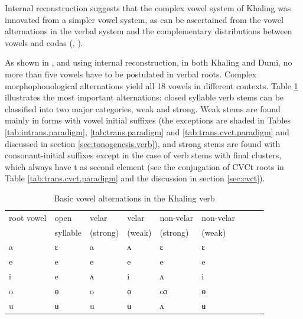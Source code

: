 \documentclass[oldfontcommands,oneside,a4paper,11pt]{article}
\newcommand{\ipa}[1]{{\phon \mbox{#1}}} %
\begin{document}
Internal reconstruction suggests that the complex vowel system of Khaling was innovated from a simpler vowel system, as can be ascertained from the vowel alternations in the verbal system and the complementary distributions between vowels and codas (\citealt{michailovsky75khaling}, \citealt{jacques12khaling}). 

As shown in \citet{michailovsky75khaling}, \citet{jacques12khaling} and \citet{michailovsky12dumi} using internal reconstruction, in both Khaling and Dumi, no more than five vowels have to be postulated in verbal roots. Complex morphophonological alternations yield all 18 vowels in different contexts. Table \ref{tab:basic.alternations} illustrates  the most important alternations: closed syllable  verb stems can be classified into two major categories, weak and strong. Weak stems are found mainly in forms with vowel initial suffixes (the exceptions are shaded in Tables \ref{tab:intrans.paradigm}, \ref{tab:trans.paradigm} and \ref{tab:trans.cvct.paradigm} and discussed in section \ref{sec:tonogenesis.verb}), and strong stems are  found with consonant-initial suffixes except in the case of verb stems with final clusters, which always have \ipa{t} as second element (see the conjugation of CVCt roots in Table \ref{tab:trans.cvct.paradigm} and the discussion in section \ref{sec:cvct}).

\begin{table}[H]
\caption{Basic vowel alternations in the Khaling verb } \label{tab:basic.alternations} \centering
\begin{tabular}{lllllllll}
\toprule
 root vowel & 	open   & 	velar  & 	velar  & 	non-velar    & 	non-velar   \\
& syllable&(strong) &(weak) &(strong) &(weak) \\
\midrule
\ipa{a}  & 	\ipa{ɛ}  & 	\ipa{a}  & 	\ipa{ʌ}  & 	\ipa{ɛ}  & 	\ipa{ɛ}  \\ 	
\ipa{e}  & 	\ipa{e}  & 	\ipa{e}  & 	\ipa{e}  & 	\ipa{e}  & 	\ipa{e}  \\ 	
\ipa{i}  & 	\ipa{e}  & 	\ipa{ʌ}  & 	\ipa{i}  & 	\ipa{ʌ}  & 	\ipa{i}  \\ 	
\ipa{o}  & 	\ipa{ɵ}  & 	\ipa{o}  & 	\ipa{ɵ}  & 	\ipa{oɔ}  & 	\ipa{ɵ}  \\ 	
\ipa{u}  & 	\ipa{ʉ}  & 	\ipa{u}  & 	\ipa{ʉ}  & 	\ipa{ʌ}  & 	\ipa{ʉ}  \\ 	
\bottomrule
\end{tabular}
\end{table}
\end{document}
